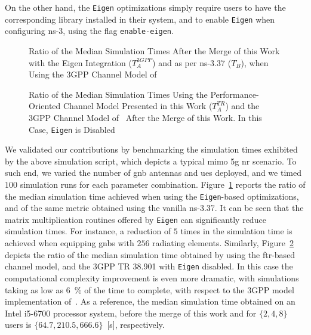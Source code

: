On the other hand, the \texttt{Eigen} optimizations simply require users to have the corresponding library installed in their system, and to enable \texttt{Eigen} when configuring ns-3, using the flag \texttt{enable\--eigen}.

\begin{figure}
    \centering 
    \setlength{}
    \setlength{}
    
    \vspace*{-0.2cm}
    \caption{Ratio of the Median Simulation Times After the Merge of this Work with the Eigen Integration ($T_{A}^{3GPP}$) and as per ns-3.37 ($T_{B}$), when Using the 3GPP Channel Model of~\cite{TR38901}}
    \label{fig:bench_eigen}
\end{figure}

\begin{figure}
    \centering 
    \setlength{}
    \setlength{}
    
    \vspace*{-0.2cm}
    \caption{Ratio of the Median Simulation Times Using the Performance-Oriented Channel Model Presented in this Work ($T_{A}^{TR}$) and the 3GPP Channel Model of~\cite{TR38901} After the Merge of this Work. In this Case, \texttt{Eigen} is Disabled}
    \label{fig:bench_tworay}
\end{figure}
 
We validated our contributions by benchmarking the simulation times exhibited by the above simulation script, which depicts a typical \gls{mimo} \gls{5g} \gls{nr} scenario. To such end, we varied the number of \gls{gnb} antennas and \glspl{ue} deployed, and we timed $100$ simulation runs for each parameter combination. Figure~\ref{fig:bench_eigen} reports the ratio of the median simulation time achieved when using the \texttt{Eigen}-based optimizations, and of the same metric obtained using the vanilla ns-3.37. It can be seen that the matrix multiplication routines offered by \texttt{Eigen} can significantly reduce simulation times. For instance, a reduction of $5$ times in the simulation time is achieved when equipping \glspl{gnb} with $256$ radiating elements.
Similarly, Figure~\ref{fig:bench_tworay} depicts the ratio of the median simulation time obtained by using the \gls{ftr}-based channel model, and the 3GPP TR 38.901 with \texttt{Eigen} disabled. In this case the computational complexity improvement is even more dramatic, with simulations taking as low as 6~\% of the time to complete, with respect to the 3GPP model implementation of~\cite{tommaso:20}. As a reference, the median simulation time obtained on an Intel\textsuperscript{\textcopyright} i5-6700 processor system, before the merge of this work and for $\{2, 4, 8\}$ users is $\{64.7, 210.5, 666.6\}$~[s], respectively.



